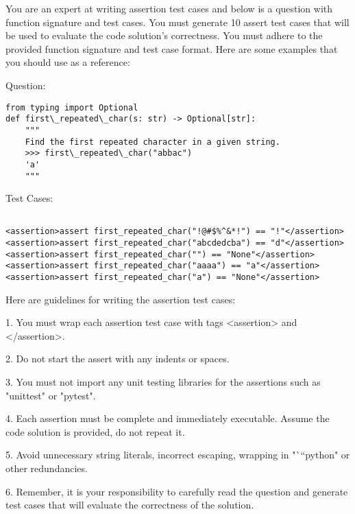 
\begin{figure*}[h]
  \centering

\begin{tcolorbox}[title={Test Case Generation Without Solution Prompt}, colback=red!0, left=2pt,right=2pt,top=2pt,bottom=2pt]

{ %
You are an expert at writing assertion test cases and below is a question with function signature and test cases. You must generate 10 assert test cases that will be used to evaluate the code solution's correctness. You must adhere to the provided function signature and test case format. Here are some examples that you should use as a reference:

\vspace{0.3cm}
Question: 

\begin{verbatim}
from typing import Optional
def first\_repeated\_char(s: str) -> Optional[str]:
    """ 
    Find the first repeated character in a given string.
    >>> first\_repeated\_char("abbac")
    'a'
    """
\end{verbatim}
Test Cases:
\begin{verbatim}

<assertion>assert first_repeated_char("!@#$%^&*!") == "!"</assertion>
<assertion>assert first_repeated_char("abcdedcba") == "d"</assertion>
<assertion>assert first_repeated_char("") == "None"</assertion>
<assertion>assert first_repeated_char("aaaa") == "a"</assertion>
<assertion>assert first_repeated_char("a") == "None"</assertion>

\end{verbatim}

Here are guidelines for writing the assertion test cases:

\vspace{0.3cm}
1. You must wrap each assertion test case with tags <assertion> and </assertion>.

2. Do not start the assert with any indents or spaces.

3. You must not import any unit testing libraries for the assertions such as "unittest" or "pytest".

4. Each assertion must be complete and immediately executable. Assume the code solution is provided, do not repeat it.

5. Avoid unnecessary string literals, incorrect escaping, wrapping in "```python" or other redundancies.

6. Remember, it is your responsibility to carefully read the question and generate test cases that will evaluate the correctness of the solution.

}
\end{tcolorbox}
\end{figure*}
